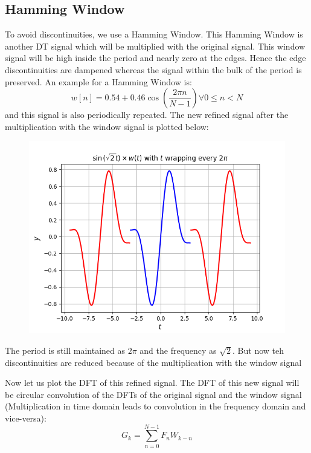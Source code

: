 \documentclass[12pt, a4paper]{article}
\begin{document}
\subsection{Hamming Window}
To avoid discontinuities, we use a Hamming Window. This Hamming Window is another DT signal which will be multiplied with the original signal. This window signal will be high inside the period and nearly zero at the edges.
Hence the edge discontinuities are dampened whereas the signal within the bulk of the period is preserved. An example for a Hamming Window is:
\begin{equation*}
    w[n] = 0.54 + 0.46\cos(\frac{2\pi n}{N-1}) \forall 0 \leq n < N
\end{equation*}
and this signal is also periodically repeated. The new refined signal after the multiplication with the window signal is plotted below:
\begin{figure}[H]
    \centering
    \includegraphics[scale = 0.8]{Figure_5.png}
    \label{fig:sample}
\end{figure}
\begin{center}
    The period is still maintained as $2\pi$ and the frequency as $\sqrt{2}$. But now teh discontinuities are reduced because of the multiplication with the window signal
\end{center}
Now let us plot the DFT of this refined signal. The DFT of this new signal will be circular convolution of the DFTs of the original signal and the window signal (Multiplication in time domain leads to convolution in the frequency domain and vice-versa):
\begin{equation*}
    G_{k} = \sum_{n=0}^{N-1}F_{n}W_{k-n}
\end{equation*}
\end{document}
